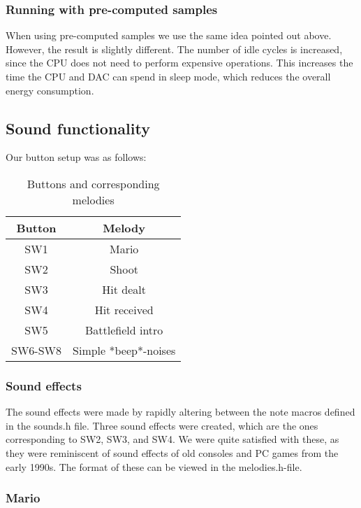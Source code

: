 \subsubsection{Running with pre-computed samples}
When using pre-computed samples we use the same idea pointed out above. However, the result is slightly different. The number of idle cycles is increased, since the CPU does not need to perform expensive operations. This increases the time the CPU and DAC can spend in sleep mode, which reduces the overall energy consumption.   


\subsection{Sound functionality}

Our button setup was as follows:

\begin{table}[ht]
\caption{Buttons and corresponding melodies}
\centering
\begin{tabular}{c c}
\hline
\hline %
Button & Melody \\ [0.5ex]
\hline
SW1 & Mario \\
SW2 & Shoot \\
SW3 & Hit dealt \\
SW4 & Hit received \\
SW5 & Battlefield intro \\
SW6-SW8 & Simple *beep*-noises \\
\hline
\end{tabular}
\label{table:nonlin}
\end{table}

\subsubsection{Sound effects}

The sound effects were made by rapidly altering between the note macros defined in the sounds.h file. Three sound effects were created, which are the ones corresponding to SW2, SW3, and SW4. We were quite satisfied with these, as they were reminiscent of sound effects of old consoles and PC games from the early 1990s. The format of these can be viewed in the melodies.h-file.

\subsubsection{Mario}

